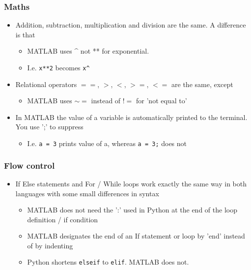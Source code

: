 \documentclass[english,14pt]{beamer}
\begin{document}

\begin{frame}[fragile]

\frametitle{Maths}

\begin{itemize}

\item Addition, subtraction, multiplication and division are the same. A difference is that
	\begin{itemize}
		\item  MATLAB uses \^ \;\; not ** for exponential. 
		\item I.e.  \texttt{x**2} becomes \texttt{x\^}
	\end{itemize}
\item Relational operators $==$, $>$, $<$, $>=$, $<=$ are the same, except
	\begin{itemize}
		\item MATLAB uses $\sim =$  instead of $!=$ for 'not equal to'
	\end{itemize}
\item In MATLAB the value of a variable is automatically printed to the terminal. You use ';' to suppress     \begin{itemize}
\item I.e. \texttt{a = 3} prints value of a, whereas \texttt{a = 3;} does not
	\end{itemize}
\end{itemize}
\end{frame}


\begin{frame}[fragile]

\frametitle{Flow control}

\begin{itemize}
	\item If Else statements and For / While loops work exactly the same way in both languages with some small differences in syntax
	\begin{itemize}
		\item MATLAB does not need the ':' used in Python at the end of the loop definition / if condition
		\item MATLAB designates the end of an If statement or loop by 'end' instead of by indenting
		\item Python shortens \texttt{elseif} to \texttt{elif}. MATLAB does not.
	\end{itemize}
\end{itemize}
\end{frame}
\end{document}
